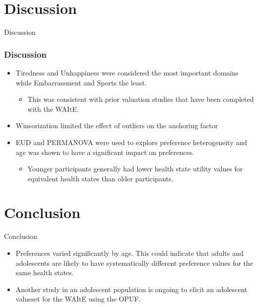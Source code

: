 \documentclass[t,compress,9pt,aspectratio=169]{beamer}
\begin{document}
\section{Discussion}
\begin{frame}{Discussion}
    \frametitle{Discussion}
    \begin{itemize}
    \item Tiredness and Unhappiness were considered the most important domains while Embarrassment and Sports the least.
    \begin{itemize}
        \item This was consistent with prior valuation studies that have been completed with the WAItE.
    \end{itemize}
    \item Winsorization limited the effect of outliers on the anchoring factor
    \item EUD and PERMANOVA were used to explore preference heterogeneity and age was shown to have a significant impact on preferences.
    \begin{itemize}
        \item Younger participants generally had lower health state utility values for equivalent health states than older participants. 
    \end{itemize}
    \end{itemize}
\end{frame}

\section{Conclusion}
\begin{frame}{Conclusion}
    \begin{itemize}
        \item Preferences varied significantly by age. This could indicate that adults and adolescents are likely to have systematically different preference values for the same health states. 
        \item Another study in an adolescent population is ongoing to elicit an adolescent valueset for the WAItE using the OPUF.
    \end{itemize}
\end{frame}

\begin{frame}

\end{frame}






\end{document}
